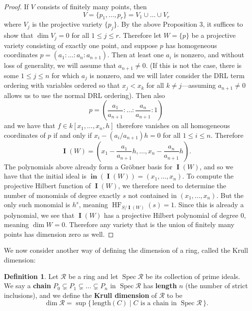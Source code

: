 \documentclass[11pt]{article}
\DeclareMathOperator{\Init}{\mathbf{in}}
\DeclareMathOperator{\Spec}{Spec}
\DeclareMathOperator{\HF}{HF}
\DeclareMathOperator{\I}{\mathbf{I}}
\theoremstyle{definition}
\newtheorem{definition}{Definition}
\begin{document}
\begin{proof}
	If $V$ consists of finitely many points, then \[ V = \{p_1, \dots, p_r\} = V_1 \cup \dots \cup V_r \] where $V_j$ is the projective variety $\{p_j\}$. By the above Proposition 3, it suffices to show that $\dim V_j = 0$ for all $1 \leq j \leq r$. Therefore let $W = \{p\}$ be a projective variety consisting of exactly one point, and suppose $p$ has homogeneous coordinates $p = (a_1: \dots: a_n: a_{n+1})$. Then at least one $a_i$ is nonzero, and without loss of generality, we will assume that $a_{n + 1} \neq 0$. (If this is not the case, there is some $1 \leq j \leq n$ for which $a_j$ is nonzero, and we will later consider the DRL term ordering with variables ordered so that $x_j < x_k$ for all $k \neq j$---assuming $a_{n + 1} \neq 0$ allows us to use the normal DRL ordering). Then also \[ p = \left( \frac{a_1}{a_{n+1}} : \dots : \frac{a_n}{a_{n+1}} : 1 \right) \] and we have that $f \in k[x_1, \dots, x_n, h]$ therefore vanishes on all homogeneous coordinates of $p$ if and only if $x_i - (a_i/a_{n+1})h = 0$ for all $1 \leq i \leq n$. Therefore \[ \I(W) = \left( x_1 - \frac{a_1}{a_{n+1}} h , \dots, x_n - \frac{a_n}{a_{n+1}}h \right). \] The polynomials above already form a Gröbner basis for $\I(W)$, and so we have that the initial ideal is $\Init(\I(W)) = (x_1, \dots, x_n)$. To compute the projective Hilbert function of $\I(W)$, we therefore need to determine the number of monomials of degree exactly $s$ not contained in $(x_1, \dots, x_n)$. But the only such monomial is $h^s$, meaning $\HF_{S/\I(W)}(s) = 1$. Since this is already a polynomial, we see that $\I(W)$ has a projective Hilbert polynomial of degree 0, meaning $\dim W = 0$. Therefore any variety that is the union of finitely many points has dimension zero as well. 
\end{proof}


We now consider another way of defining the dimension of a ring, called the Krull dimension:

\begin{definition}
	Let $\mathcal{R}$ be a ring and let $\Spec \mathcal{R}$ be its collection of prime ideals. We say a \textbf{chain} $P_0 \subsetneq P_1 \subsetneq \dots \subsetneq P_n$ in $\Spec \mathcal{R}$ has \textbf{length} $n$ (the number of strict inclusions), and we define the \textbf{Krull dimension} of $\mathcal{R}$ to be \[ \dim \mathcal{R} = \sup \{\,\text{length}(C) \mid C \text{ is a chain in } \Spec \mathcal{R}\,\}. \]
\end{definition}
\end{document}
